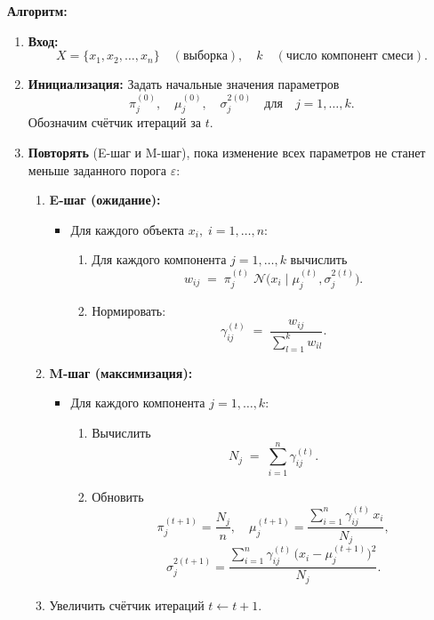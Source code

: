 \noindent
\textbf{Алгоритм:}
\begin{enumerate}
    \item \textbf{Вход:} 
    \[
      X = \{x_1, x_2, \dots, x_n\} \quad (\text{выборка}), 
      \quad k \quad (\text{число компонент смеси}).
    \]

    \item \textbf{Инициализация:} Задать начальные значения параметров
    \[
      \pi_j^{(0)}, \quad \mu_j^{(0)}, \quad \sigma_j^{2(0)}
      \quad\text{для}\quad j = 1,\dots,k.
    \]
    Обозначим счётчик итераций за \(t\).

    \item \textbf{Повторять} (E-шаг и M-шаг), пока изменение всех параметров не станет меньше заданного порога \(\varepsilon\):
    \begin{enumerate}
        \item \textbf{E-шаг (ожидание):}
        \begin{itemize}
            \item Для каждого объекта \(x_i,\; i = 1,\dots,n\):
            \begin{enumerate}
                \item Для каждого компонента \(j = 1,\dots,k\) вычислить
                \[
                  w_{ij} \;=\; \pi_j^{(t)} \;\mathcal{N}\!\bigl(x_i \mid \mu_j^{(t)}, \sigma_j^{2(t)}\bigr).
                \]
                \item Нормировать:
                \[
                  \gamma_{ij}^{(t)} \;=\;
                    \frac{w_{ij}}{\sum_{l=1}^k w_{il}}.
                \]
              \end{enumerate}
        \end{itemize}

        \item \textbf{M-шаг (максимизация):}
        \begin{itemize}
            \item Для каждого компонента \(j = 1,\dots,k\):
            \begin{enumerate}
                \item Вычислить 
                \[
                  N_j \;=\; \sum_{i=1}^n \gamma_{ij}^{(t)}.
                \]
                \item Обновить 
                \[
                  \pi_j^{(t+1)} = \frac{N_j}{n}, 
                  \quad
                  \mu_j^{(t+1)} = \frac{\sum_{i=1}^n \gamma_{ij}^{(t)}\,x_i}{N_j},
                \]
                \[
                  \sigma_j^{2(t+1)} 
                  = \frac{\sum_{i=1}^n \gamma_{ij}^{(t)}\,\bigl(x_i - \mu_j^{(t+1)}\bigr)^2}{N_j}.
                \]
            \end{enumerate}
        \end{itemize}

        \item Увеличить счётчик итераций \(t \leftarrow t + 1\).
    \end{enumerate}
\end{enumerate}

